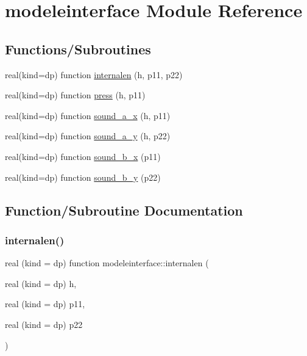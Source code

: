 \hypertarget{namespacemodeleinterface}{}\section{modeleinterface Module Reference}
\label{namespacemodeleinterface}
\subsection*{Functions/\+Subroutines}
\begin{DoxyCompactItemize}
\item 
real(kind=dp) function \mbox{\hyperlink{namespacemodeleinterface_a4d0b51322903b5a095f04aaafb1a8c5f}{internalen}} (h, p11, p22)
\item 
real(kind=dp) function \mbox{\hyperlink{namespacemodeleinterface_ad34088de8c0162343994153e8f34921e}{press}} (h, p11)
\item 
real(kind=dp) function \mbox{\hyperlink{namespacemodeleinterface_a1505c575aa44b45a8509fe827f28bc8d}{sound\+\_\+a\+\_\+x}} (h, p11)
\item 
real(kind=dp) function \mbox{\hyperlink{namespacemodeleinterface_aea42339ec55b6d0e7333dcd4c2d6041f}{sound\+\_\+a\+\_\+y}} (h, p22)
\item 
real(kind=dp) function \mbox{\hyperlink{namespacemodeleinterface_aa422a9d23665a7fa175a3458f15d6be2}{sound\+\_\+b\+\_\+x}} (p11)
\item 
real(kind=dp) function \mbox{\hyperlink{namespacemodeleinterface_ae6539d207be975bdb5b8c45826062a30}{sound\+\_\+b\+\_\+y}} (p22)
\end{DoxyCompactItemize}


\subsection{Function/\+Subroutine Documentation}
\mbox{\label{namespacemodeleinterface_a4d0b51322903b5a095f04aaafb1a8c5f}} 
\subsubsection{\texorpdfstring{internalen()}{internalen()}}
{\footnotesize\ttfamily real (kind = dp) function modeleinterface\+::internalen (\begin{DoxyParamCaption}\item[{real (kind = dp)}]{h,  }\item[{real (kind = dp)}]{p11,  }\item[{real (kind = dp)}]{p22 }\end{DoxyParamCaption})}

